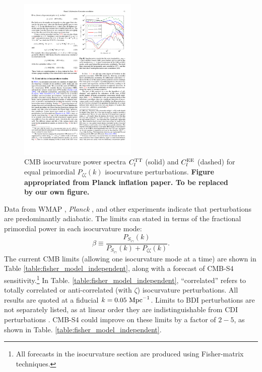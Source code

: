 \begin{figure}[htbp!]
\includegraphics[width=0.5\textwidth, trim={0 10 0 0},clip]{Inflation/iso_schematic.pdf} 
 \caption{CMB isocurvature power spectra $C_{l}^{\rm TT}$ (solid) and $C_{l}^{\rm EE}$ (dashed) for equal primordial $P_{\zeta\zeta}(k)$  isocurvature perturbations. \textbf{Figure appropriated from Planck inflation paper. To be replaced by our own figure.}
\label{fig:iso_schematic}}
\end{figure} 

Data from WMAP \cite{dunkley09}, \textit{Planck} \cite{Ade:2015lrj}, and other experiments \cite{Enqvist:2000hp,MacTavish:2005yk} indicate that perturbations are predominantly adiabatic. The limits can stated in terms of the fractional primordial power in each isocurvature mode:\begin{equation}
\beta\equiv \frac{P_{S_{i\gamma}}(k)}{P_{S_{i\gamma}}(k)+P_{\zeta\zeta}(k)}.
\end{equation}
The current CMB limits (allowing one isocurvature mode at a time) are shown in Table \ref{table:fisher_model_independent}, along with a forecast of CMB-S4 sensitivity.\footnote{All forecasts in the isocurvature section are produced using Fisher-matrix techniques.} In Table. \ref{table:fisher_model_independent}, ``correlated'' refers to totally correlated or anti-correlated (with $\zeta$) isocurvature perturbations. All results are quoted at a fiducial $k=0.05~{\rm Mpc}^{-1}$. Limits to BDI perturbations are not separately listed, as at linear order they are indistinguishable from CDI perturbations \cite{Gordon:2002gv,Lewis:2002nc,Lewis:2007kz,Gordon:2009wx}. CMB-S4 could improve on these limits by a factor of $2-5$, as shown in Table. \ref{table:fisher_model_independent}.

